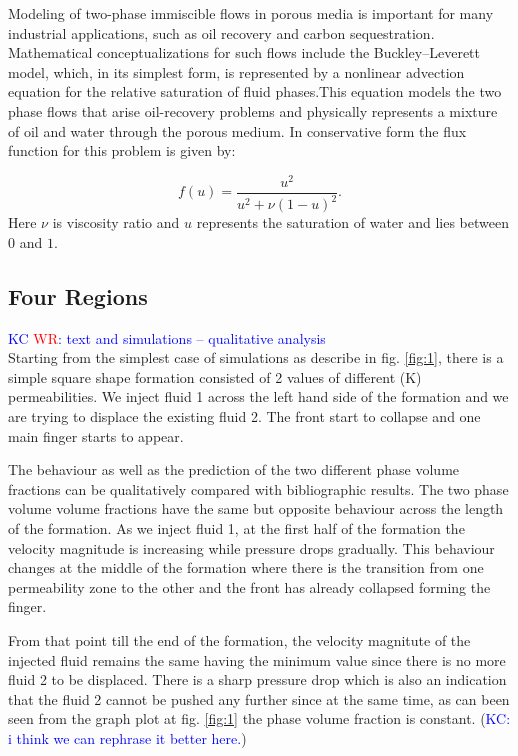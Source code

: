 \documentclass[preprint,authoryear,12pt]{elsarticle}
\begin{document}
Modeling of two-phase immiscible flows in porous media is
important for many industrial applications, such as oil recovery and carbon sequestration. Mathematical conceptualizations for such flows include the Buckley–Leverett model, which, in its simplest form, is represented by a nonlinear advection equation for the relative saturation of fluid phases.This equation models the two phase flows that arise oil-recovery problems and physically
represents a mixture of oil and water through the porous medium.
In conservative form the flux function for this
problem is given by:

\begin{equation}
f(u) = \frac{u^2}{u^2 + \nu(1-u)^2}. \label{buckley}
\end{equation}
Here $\nu$ is viscosity ratio and $u$ represents the saturation of water and
lies between $0$ and $1$.

\subsection{Four Regions}\label{section:4Regions}
\textcolor{blue}{KC \textcolor{red}{WR}: text and simulations -- qualitative analysis}\\

Starting from the simplest case of simulations as describe in fig. \ref{fig:1}, there is a simple square shape formation consisted of 2 values of different (K) permeabilities. We inject fluid 1 across the left hand side of the formation and we are trying to displace the existing fluid 2. The front start to collapse and one main finger starts to appear.

The behaviour as well as the prediction of the two different phase volume fractions can be qualitatively compared with bibliographic results. The two phase volume volume fractions have the same but opposite behaviour across the length of the formation. As we inject fluid 1, at the first half of the formation the velocity magnitude is increasing while pressure drops gradually. This behaviour changes at the middle of the formation where there is the transition from one permeability zone to the other and the front has already collapsed forming the finger. 

From that point till the end of the formation, the velocity magnitute of the injected fluid remains the same having the minimum value since there is no more fluid 2 to be displaced. There is a sharp pressure drop which is also an indication that the fluid 2 cannot be pushed any further since at the same time, as can been seen from the graph plot at fig. \ref{fig:1} the phase volume fraction is constant. (\textcolor{blue}{KC: i think we can rephrase it better here.}) 
\end{document}
